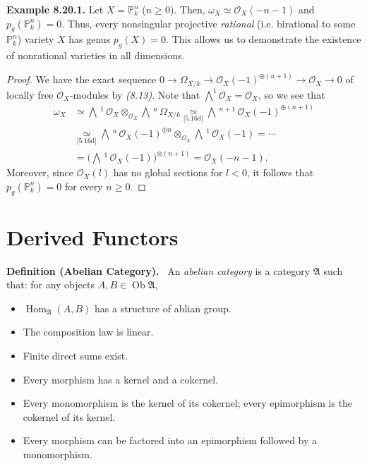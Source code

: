 \documentclass[11pt,a4paper,footinclude=true,headinclude=true]{scrbook} %
\DeclareMathOperator{\Hom}{Hom}
\DeclareMathOperator{\Ob}{Ob}
\newcommand{\OO}{\mathcal{O}}
\newcommand{\Af}{\mathfrak{A}}
\newcommand{\PP}{\mathbb{P}}
\newcommand{\<}{\langle}
\newcommand{\>}{\rangle}
\newenvironment{definition}[2][Definition]
    { \begin{mdframed}[backgroundcolor=gray!20] \textbf{#1 #2.}\ }
    {  \end{mdframed}}
\newenvironment{example}[2][Example]
    { \begin{mdframed}[backgroundcolor=gray!20] \textbf{#1 #2.} }
    {  \end{mdframed}}
\begin{document}
\begin{example}{8.20.1}
    Let $X=\PP_k^n$ ($n\geq0$). Then, $\omega_X\simeq\OO_X(-n-1)$ and $p_g(\PP_k^n)=0$. Thus, every nonsingular projective \textit{rational} (i.e. birational to some $\PP_k^n$) variety $X$ has genus $p_g(X)=0$. This allows us to demonstrate the existence of nonrational varieties in all dimensions.
\end{example}
\begin{proof}
    We have the exact sequence $0\to\Omega_{X/k}\to\OO_X(-1)^{\oplus(n+1)}\to\OO_X\to0$ of locally free $\OO_X$-modules by \textit{(8.13)}. Note that $\bigwedge^1\OO_X=\OO_X$, so we see that
    \begin{align*}
        \omega_X &\simeq\bigwedge\,^1\,\OO_X\otimes_{\OO_X}\bigwedge\,^n\,\Omega_{X/k}\underset{\text{[5.16d]}}{\simeq}\bigwedge\,^{n+1}\,\OO_X(-1)^{\oplus(n+1)}\\ &\underset{\text{[5.16d]}}{\simeq}\bigwedge\,^n\,\OO_X(-1)^{\oplus n}\otimes_{\OO_X}\bigwedge\,^1\,\OO_X(-1)=\cdots\\ &=\Big(\bigwedge\,^1\,\OO_X(-1)\Big)^{\otimes(n+1)}=\OO_X(-n-1).
    \end{align*}
    Moreover, since $\OO_X(l)$ has no global sections for $l<0$, it follows that $p_g(\PP_k^n)=0$ for every $n\geq0$.
\end{proof}

\chapter{Derived Functors}

\begin{definition}{(Abelian Category)}\newline
    An \textit{abelian category} is a category $\Af$ such that: for any objects $A,B\in\Ob\Af$,
    \begin{itemize}
        \item $\Hom_\Af(A,B)$ has a structure of ablian group.
        \item The composition law is linear.
        \item Finite direct sums exist.
        \item Every morphism has a kernel and a cokernel.
        \item Every monomorphism is the kernel of its cokernel; every epimorphism is the cokernel of its kernel.
        \item Every morphism can be factored into an epimorphism followed by a monomorphism.
    \end{itemize}
\end{definition}
\end{document}
